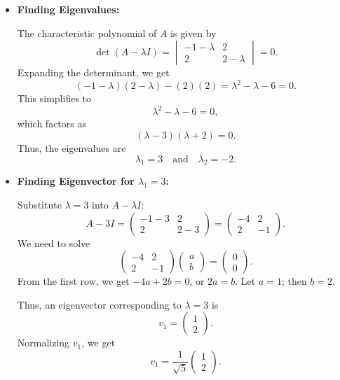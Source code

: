 \documentclass{article}
\begin{document}
\begin{itemize}
    \item \textbf{Finding Eigenvalues:}

          The characteristic polynomial of \( A \) is given by
          \[
              \det(A - \lambda I) = \begin{vmatrix} -1 - \lambda & 2 \\ 2 & 2 - \lambda \end{vmatrix} = 0.
          \]
          Expanding the determinant, we get
          \[
              (-1 - \lambda)(2 - \lambda) - (2)(2) = \lambda^2 - \lambda - 6 = 0.
          \]
          This simplifies to
          \[
              \lambda^2 - \lambda - 6 = 0,
          \]
          which factors as
          \[
              (\lambda - 3)(\lambda + 2) = 0.
          \]
          Thus, the eigenvalues are
          \[
              \lambda_1 = 3 \quad \text{and} \quad \lambda_2 = -2.
          \]

    \item \textbf{Finding Eigenvector for \( \lambda_1 = 3 \):}

          Substitute \( \lambda = 3 \) into \( A - \lambda I \):
          \[
              A - 3I = \begin{pmatrix} -1 - 3 & 2 \\ 2 & 2 - 3 \end{pmatrix} = \begin{pmatrix} -4 & 2 \\ 2 & -1 \end{pmatrix}.
          \]
          We need to solve
          \[
              \begin{pmatrix} -4 & 2 \\ 2 & -1 \end{pmatrix} \begin{pmatrix} a \\ b \end{pmatrix} = \begin{pmatrix} 0 \\ 0 \end{pmatrix}.
          \]
          From the first row, we get \( -4a + 2b = 0 \), or \( 2a = b \). Let \( a = 1 \); then \( b = 2 \).

          Thus, an eigenvector corresponding to \( \lambda = 3 \) is
          \[
              v_1 = \begin{pmatrix} 1 \\ 2 \end{pmatrix}.
          \]
          Normalizing \( v_1 \), we get
          \[
              v_1 = \frac{1}{\sqrt{5}} \begin{pmatrix} 1 \\ 2 \end{pmatrix}.
          \]


\end{itemize}
\end{document}
